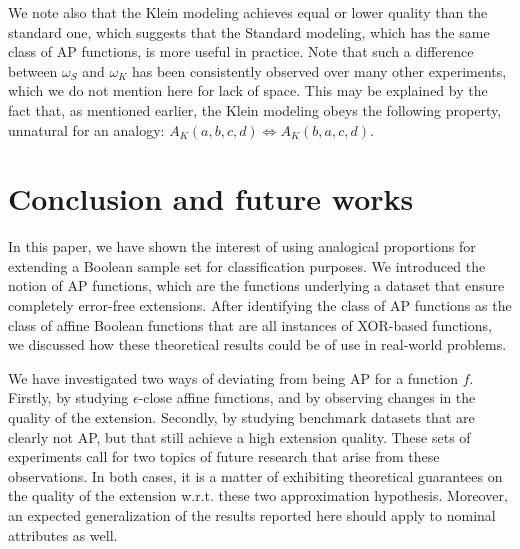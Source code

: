 \documentclass[article]{amsart}
\begin{document}
We note also that the Klein modeling achieves equal or lower quality than the
standard one, which suggests that the Standard modeling, which has the same
class of AP functions, is more useful in practice. Note that such a difference
between $\omega_S$ and $\omega_K$ has been consistently observed over many
other experiments, which we do not mention here for lack of space. This may be
explained by the fact that, as mentioned earlier, the Klein modeling obeys
the following property, unnatural  for an analogy: $A_K(a, b, c, d)
\iff A_K(b, a, c, d)$.

\section{Conclusion and future works}\label{conclusion}

In this paper, we have shown the interest of using analogical proportions for extending a
Boolean sample set for classification purposes. We introduced the notion of AP
functions, which are the functions underlying a dataset that ensure
completely error-free extensions. After identifying the class of AP functions
as the class of affine Boolean functions that are all instances of
XOR-based  functions, we discussed how these theoretical results could be of
use in real-world problems.

We have investigated two ways of deviating from being AP for a function $f$.
Firstly, by studying $\epsilon$-close affine functions, and by observing
changes in the quality of the extension. Secondly, by studying benchmark
datasets that are clearly not AP, but that still achieve a high extension
quality. These sets of experiments call for two topics of future research that
arise from these observations. In both cases, it is a matter of exhibiting
theoretical guarantees on the quality of the extension w.r.t. these two
approximation hypothesis.  Moreover, an expected generalization of the results
reported here should apply to nominal attributes as well.


\newpage

%



\end{document}
